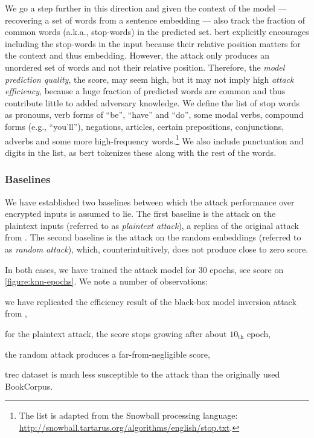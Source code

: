 				We go a step further in this direction and given the context of the model --- recovering a set of words from a sentence embedding --- also track the fraction of common words (a.k.a., stop-words) in the predicted set.
				\acrshort{bert} explicitly encourages including the stop-words in the input because their relative position matters for the context and thus embedding.
				However, the attack only produces an unordered set of words and not their relative position.
				Therefore, the \emph{model prediction quality}, the \FOne{} score, may seem high, but it may not imply high \emph{attack efficiency}, because a huge fraction of predicted words are common and thus contribute little to added adversary knowledge.
				We define the list of stop words as pronouns, verb forms of ``be'', ``have'' and ``do'', some modal verbs, compound forms (e.g., ``you'll''), negations, articles, certain prepositions, conjunctions, adverbs and some more high-frequency words.\footnote{
					The list is adapted from the Snowball processing language: \url{http://snowball.tartarus.org/algorithms/english/stop.txt}.
				}
				We also include punctuation and digits in the list, as \acrshort{bert} tokenizes these along with the rest of the words.

			\subsubsection{Baselines}\label{section:knn-snapshot:attacks:experiments:baselines}

				

				We have established two baselines between which the attack performance over encrypted inputs is assumed to lie.
				The first baseline is the attack on the plaintext inputs (referred to as \emph{plaintext attack}), a replica of the original attack from \cite{embedding-attacks}.
				The second baseline is the attack on the random embeddings (referred to as \emph{random attack}), which, counterintuitively, does not produce close to zero \FOne{} score.

				In both cases, we have trained the attack model for 30 epochs, see \FOne{} score on \cref{figure:knn-epochs}.
				We note a number of observations:
				\begin{enumerate*}[label={(\roman*)}]
					\item we have replicated the efficiency result of the black-box model inversion attack from \cite[Table 2, \FOne{} score, same domain, $\mathcal{L}_{\text{\acrshort{msp}}}$, \acrshort{bert}]{embedding-attacks},
					\item for the plaintext attack, the \FOne{} score stops growing after about $10_\text{th}$ epoch,
					\item the random attack produces a far-from-negligible \FOne{} score,
					\item \acrshort{trec} dataset is much less susceptible to the attack than the originally used BookCorpus.
				\end{enumerate*}

